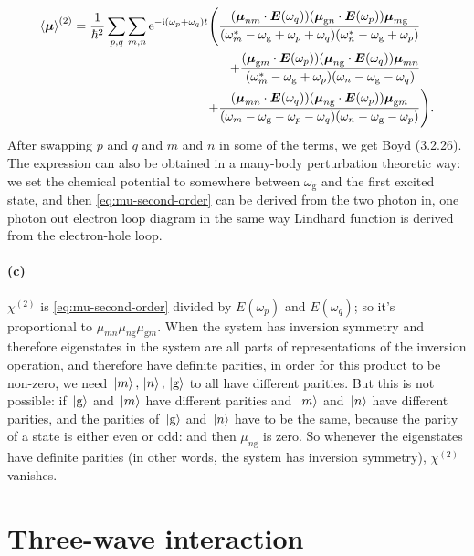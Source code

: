 \documentclass[hyperref, a4paper]{article}
\newcommand*{\ii}{\mathrm{i}}
\newcommand*{\ee}{\mathrm{e}}
\newcommand*{\omegag}{\omega_{\text{g}}}
\begin{document}
\begin{equation}
    \begin{aligned}
        \expval{\vb*{\mu}}^{(2)} = 
        \frac{1}{\hbar^2} \sum_{p, q} \sum_{m, n}
        \ee^{- \ii (\omega_p + \omega_q) t} 
        \Biggl(
            \frac{
                (\vb*{\mu}_{nm} \cdot \vb*{E}(\omega_q)) 
                (\vb*{\mu}_{\text{g} n} \cdot \vb*{E}(\omega_p)) 
                \vb*{\mu}_{m \text{g}}
            }{
                (\omega_m^* - \omegag + \omega_p + \omega_q)
                (\omega_n^* - \omegag + \omega_p)
            } & \\
            \quad +
            \frac{
                (\vb*{\mu}_{\text{g} m} \cdot \vb*{E}(\omega_p)) 
                (\vb*{\mu}_{n \text{g}} \cdot \vb*{E}(\omega_q)) 
                \vb*{\mu}_{m n} 
            }{
                (\omega_m^* - \omegag + \omega_p) 
                (\omega_n - \omegag - \omega_q)
            }& \\
            +  
            \frac{
                (\vb*{\mu}_{mn} \cdot \vb*{E}(\omega_q)) 
                (\vb*{\mu}_{n \text{g}} \cdot \vb*{E}(\omega_p))
                \vb*{\mu}_{\text{g} m}
            }{
                (\omega_m - \omegag - \omega_p - \omega_q)
                (\omega_n - \omegag - \omega_p)
            }& 
        \Biggr).
    \end{aligned}
    \label{eq:mu-second-order}
\end{equation} 
After swapping $p$ and $q$ and $m$ and $n$ in some of the terms, 
we get Boyd (3.2.26).
The expression can also be obtained in a many-body perturbation theoretic way: 
we set the chemical potential to somewhere between $\omegag$ 
and the first excited state, 
and then \eqref{eq:mu-second-order} can be derived from 
the two photon in, one photon out electron loop diagram 
in the same way Lindhard function is derived from the electron-hole loop.

\paragraph*{(c)} $\chi^{(2)}$ is \eqref{eq:mu-second-order} 
divided by $E(\omega_p)$ and $E(\omega_q)$;
so it's proportional to $\mu_{mn} \mu_{n \text{g}} \mu_{\text{g} m}$.
When the system has inversion symmetry 
and therefore eigenstates in the system are all parts of 
representations of the inversion operation, 
and therefore have definite parities,
in order for this product to be non-zero, we need $\ket*{m}, \ket*{n}, \ket*{\text{g}}$
to all have different parities.
But this is not possible: 
if $\ket*{\text{g}}$ and $\ket*{m}$ have different parities 
and $\ket*{m}$ and $\ket*{n}$ have different parities, 
and the parities of $\ket*{\text{g}}$ and $\ket*{n}$
have to be the same, because the parity of a state is either even or odd: 
and then $\mu_{n \text{g}}$ is zero.
So whenever the eigenstates have definite parities 
(in other words, the system has inversion symmetry), 
$\chi^{(2)}$ vanishes.

\section{Three-wave interaction} 

\subsection{}
\end{document}
